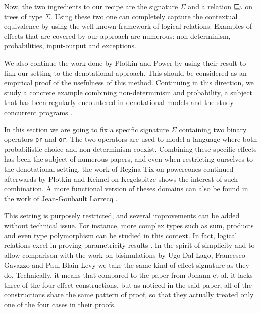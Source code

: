 Now, the two ingredients to our recipe are 
the signature $\Sigma$ and a relation $\sqsubseteq_b$ 
on trees of type $\Sigma$. Using these two one
can completely capture the contextual equivalence 
by using the well-known framework of logical relations.
Examples of effects that are covered by our 
approach are numerous: non-determinism, probabilities, 
input-output and exceptions. 


We also continue the work done by Plotkin and Power \cite{plotkin2001adequacy}
by using their result to link our setting to the denotational approach. This 
should be considered as an empirical proof of the usefulness of this method. 
Continuing in this direction, we study a concrete example combining
non-determinism and probability, a subject that has been regularly encountered 
in denotational models \cite{tix2009semantic} \cite{JGL-mscs16}
\cite{KeimelP2016} and the study concurrent programs
\cite{Mislove2000} \cite{mislove2004axioms}.


In this section we are going to fix a specific signature $\Sigma$
containing two binary operators \texttt{pr} and \texttt{or}. The two
operators are used to model a language where both probabilistic choice 
and non-determinism coexist. Combining these specific effects has been 
the subject of numerous papers, and even when restricting ourselves to the 
denotational setting, the work of Regina Tix on powercones \cite{tix2009semantic} 
continued afterwards by Plotkin and Keimel \cite{KeimelP2016} on Kegelspitze
shows the interest of such combination.
A more functional version of theses domains can also be found in the work of Jean-Goubault Larrecq 
\cite{JGL-mscs16}.


This setting is purposely restricted, and several improvements can 
be added without technical issue. For instance, more complex types 
such as sum, products and even type polymorphism can be studied 
in this context. In fact, logical relations excel in proving parametricity 
results \cite{wadler1989theorems}.
In the spirit of simplicity 
and to allow comparison with the work on bisimulations by
Ugo Dal Lago, Francesco Gavazzo and Paul Blain Levy
\cite{Ugo2017} we take the same kind of effect signature 
as they do. Technically, it means that compared to 
the paper from Johann et al. \cite{gom} it lacks 
three of the four effect constructions, but as noticed 
in the said paper, all of the constructions share the
same pattern of proof, so that they actually treated 
only one of the four cases in their proofs.

